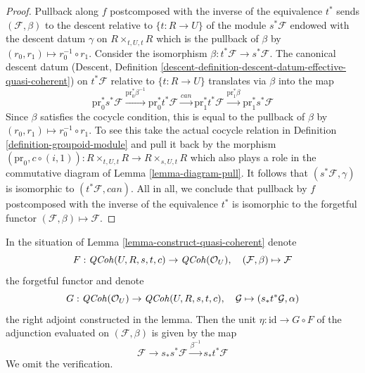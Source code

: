 \begin{proof}
\medskip\noindent
Pullback along $f$ postcomposed with the inverse of the equivalence $t^*$
sends $(\mathcal{F}, \beta)$ to the descent relative to $\{t : R \to U\}$
of the module $s^*\mathcal{F}$ endowed with the descent datum $\gamma$ on
$R \times_{t, U, t} R$ which is the pullback of $\beta$ by
$(r_0, r_1) \mapsto r_0^{-1} \circ r_1$.
Consider the isomorphism $\beta : t^*\mathcal{F} \to s^*\mathcal{F}$.
The canonical descent datum (Descent, Definition
\ref{descent-definition-descent-datum-effective-quasi-coherent})
on $t^*\mathcal{F}$ relative to $\{t : R \to U\}$
translates via $\beta$ into the map
$$
\text{pr}_0^*s^*\mathcal{F}
\xrightarrow{\text{pr}_0^*\beta^{-1}}
\text{pr}_0^*t^*\mathcal{F}
\xrightarrow{can}
\text{pr}_1^*t^*\mathcal{F}
\xrightarrow{\text{pr}_1^*\beta}
\text{pr}_1^*s^*\mathcal{F}
$$
Since $\beta$ satisfies the cocycle condition, this is equal to the pullback
of $\beta$ by $(r_0, r_1) \mapsto r_0^{-1} \circ r_1$. To see this
take the actual cocycle relation in Definition \ref{definition-groupoid-module}
and pull it back by the morphism
$(\text{pr}_0, c \circ (i, 1)) : R \times_{t, U, t} R \to R \times_{s, U, t} R$
which also plays a role in the commutative diagram of
Lemma \ref{lemma-diagram-pull}. It follows that
$(s^*\mathcal{F}, \gamma)$ is isomorphic to $(t^*\mathcal{F}, can)$.
All in all, we conclude that pullback by $f$ postcomposed with the
inverse of the equivalence $t^*$ is isomorphic to the forgetful functor
$(\mathcal{F}, \beta) \mapsto \mathcal{F}$.
\end{proof}

\begin{remark}
\label{remark-adjunction-map}
In the situation of Lemma \ref{lemma-construct-quasi-coherent} denote
$$
F : \mathit{QCoh}(U, R, s, t, c) \to \mathit{QCoh}(\mathcal{O}_U),\quad
(\mathcal{F}, \beta) \mapsto \mathcal{F}
$$
the forgetful functor and denote
$$
G : \mathit{QCoh}(\mathcal{O}_U) \to \mathit{QCoh}(U, R, s, t, c),\quad
\mathcal{G} \mapsto (s_*t^*\mathcal{G}, \alpha)
$$
the right adjoint constructed in the lemma. Then the unit
$\eta : \text{id} \to G \circ F$ of the adjunction evaluated
on $(\mathcal{F}, \beta)$ is given by the map
$$
\mathcal{F} \to s_*s^*\mathcal{F} \xrightarrow{\beta^{-1}} s_*t^*\mathcal{F}
$$
We omit the verification.
\end{remark}

